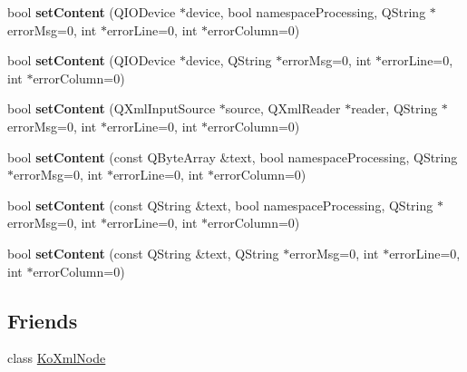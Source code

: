\begin{CompactItemize}
\item 
\hypertarget{classKoXmlDocument_e9f84dc9b1ae3cd561628fbcb4b0d0e5}{
bool \textbf{setContent} (QIODevice $\ast$device, bool namespaceProcessing, QString $\ast$errorMsg=0, int $\ast$errorLine=0, int $\ast$errorColumn=0)}
\label{classKoXmlDocument_e9f84dc9b1ae3cd561628fbcb4b0d0e5}

\item 
\hypertarget{classKoXmlDocument_e14a8ad6b1c2d80acd8416900c1e04d7}{
bool \textbf{setContent} (QIODevice $\ast$device, QString $\ast$errorMsg=0, int $\ast$errorLine=0, int $\ast$errorColumn=0)}
\label{classKoXmlDocument_e14a8ad6b1c2d80acd8416900c1e04d7}

\item 
\hypertarget{classKoXmlDocument_9985cf50d73165c1de6140d1bcec48ff}{
bool \textbf{setContent} (QXmlInputSource $\ast$source, QXmlReader $\ast$reader, QString $\ast$errorMsg=0, int $\ast$errorLine=0, int $\ast$errorColumn=0)}
\label{classKoXmlDocument_9985cf50d73165c1de6140d1bcec48ff}

\item 
\hypertarget{classKoXmlDocument_95a6f5727a5b9b494c3c6cf071b41c9c}{
bool \textbf{setContent} (const QByteArray \&text, bool namespaceProcessing, QString $\ast$errorMsg=0, int $\ast$errorLine=0, int $\ast$errorColumn=0)}
\label{classKoXmlDocument_95a6f5727a5b9b494c3c6cf071b41c9c}

\item 
\hypertarget{classKoXmlDocument_1a35de2b10068b15f7db3f35a9e78768}{
bool \textbf{setContent} (const QString \&text, bool namespaceProcessing, QString $\ast$errorMsg=0, int $\ast$errorLine=0, int $\ast$errorColumn=0)}
\label{classKoXmlDocument_1a35de2b10068b15f7db3f35a9e78768}

\item 
\hypertarget{classKoXmlDocument_45df03a6aac81990c5ad19975126f5b3}{
bool \textbf{setContent} (const QString \&text, QString $\ast$errorMsg=0, int $\ast$errorLine=0, int $\ast$errorColumn=0)}
\label{classKoXmlDocument_45df03a6aac81990c5ad19975126f5b3}

\end{CompactItemize}
\subsection*{Friends}
\begin{CompactItemize}
\item 
\hypertarget{classKoXmlDocument_6c97883f92c7cbf2ecdf17db6cea8297}{
class \hyperlink{classKoXmlDocument_6c97883f92c7cbf2ecdf17db6cea8297}{KoXmlNode}}
\label{classKoXmlDocument_6c97883f92c7cbf2ecdf17db6cea8297}

\end{CompactItemize}


